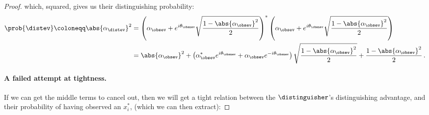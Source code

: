 \begin{proof}
      \noindent
      which, squared, gives us their distinguishing probability:
      \begin{align*}
        \prob{\distev} \coloneqq \abs{\alpha_\distev}^2 &= 
          \left( \alpha_\obsev + e^{i\theta_{\obsnev}} \sqrt{\frac{1 -
          \abs{\alpha_\obsev}^2}{2}} \right)^*
          \left( \alpha_\obsev + e^{i\theta_{\obsnev}} \sqrt{\frac{1 -
          \abs{\alpha_\obsev}^2}{2}} \right) \\
        &= \abs{\alpha_\obsev}^2 + \left( \alpha_\obsev^* e^{i\theta_{\obsnev}} 
          + \alpha_\obsev e^{-i\theta_{\obsnev}} \right) \sqrt{\frac{1 -
          \abs{\alpha_\obsev}^2}{2}} 
          + \frac{1 - \abs{\alpha_\obsev}^2}{2}\, .
      \end{align*}

      \paragraph{A failed attempt at tightness.}
        If we can get the middle terms to cancel out, then we will get a tight relation
          between the $\distinguisher$'s distinguishing advantage, and their
          probability of having observed an $x^*_i$, (which we can then extract):


\end{proof}
